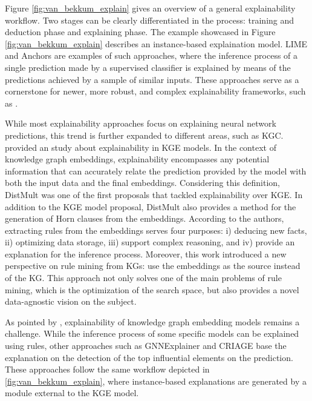 Figure \ref{fig:van_bekkum_explain} gives an overview of a general explainability workflow. Two stages can be clearly differentiated in the process: training and deduction phase and explaining phase. The example showcased in Figure \ref{fig:van_bekkum_explain} describes an instance-based explaination model. LIME \citep{ribeiro_lime_2016} and Anchors \citep{Ribeiro_Singh_Guestrin_2018} are examples of such approaches, where the inference process of a single prediction made by a supervised classifier is explained by means of the predictions achieved by a sample of similar inputs. These approaches serve as a cornerstone for newer, more robust, and complex explainability frameworks, such as \cite{arya_one_2019}. 

While most explainability approaches focus on explaining neural network predictions, this trend is further expanded to different areas, such as KGC. \cite{bianchi_kge_explainability_2020} provided an study about explainability in KGE models. In the context of knowledge graph embeddings, explainability encompasses any potential information that can accurately relate the prediction provided by the model with both the input data and the final embeddings. Considering this definition, DistMult \citep{distmult} was one of the first proposals that tackled explainability over KGE. In addition to the KGE model proposal, DistMult also provides a method for the generation of Horn clauses from the embeddings. According to the authors, extracting rules from the embeddings serves four purposes: i) deducing new facts, ii) optimizing data storage, iii) support complex reasoning, and iv) provide an explanation for the inference process. Moreover, this work introduced a new perspective on rule mining from KGs: use the embeddings as the source instead of the KG. This approach not only solves one of the main problems of rule mining, which is the optimization of the search space, but also provides a novel data-agnostic vision on the subject. 

As pointed by \cite{bianchi_kge_explainability_2020}, explainability of knowledge graph embedding models remains a challenge. While the inference process of some specific models can be explained using rules, other approaches such as GNNExplainer \citep{ying_2019_gnnexplainer} and CRIAGE \citep{pezeshkpour_2019_investigating} base the explanation on the detection of the top influential elements on the prediction. These approaches follow the same workflow depicted in \ref{fig:van_bekkum_explain}, where instance-based explanations are generated by a module external to the KGE model. 

